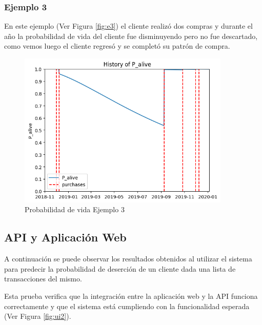 \subsubsection{Ejemplo 3}

En este ejemplo (Ver Figura \ref{fig:e3}) el cliente realizó dos compras y durante el año la probabilidad de vida del cliente fue disminuyendo pero no fue descartado, como vemos luego el cliente regresó y se completó su patrón de compra.

\begin{figure}[H]
	\centering \includegraphics[width=0.90\textwidth]{images/e4.png}
	\caption{Probabilidad de vida Ejemplo 3}
	\label{fig:e4}
\end{figure}



\subsection{API y Aplicación Web}

A continuación se puede observar los resultados obtenidos al utilizar el sistema para predecir la probabilidad de deserción de un cliente dada una lista de transacciones del mismo.

	Esta prueba verifica que la integración entre la aplicación web y la API funciona correctamente y que el sistema está cumpliendo con la funcionalidad esperada (Ver Figura \ref{fig:ui2}).
	
